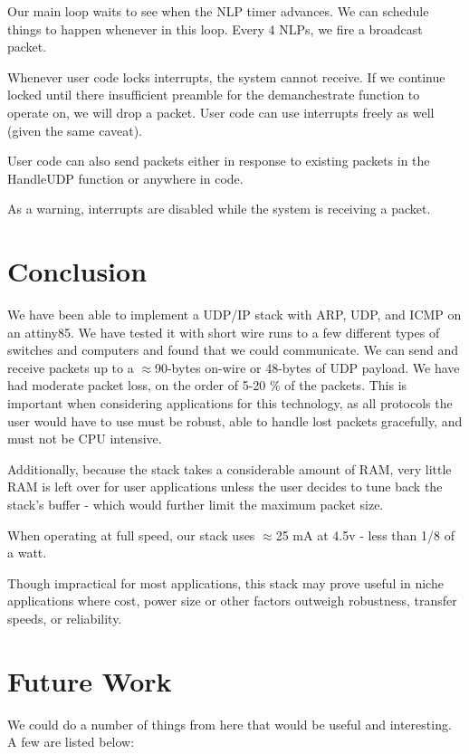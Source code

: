 \documentclass[13pt]{ltxdoc}
\begin{document}
Our main loop waits to see when the NLP timer advances.  We can schedule things to happen whenever in this loop. 
Every 4 NLPs, we fire a broadcast packet.  

Whenever user code locks interrupts, the system cannot receive.  If we continue locked until there insufficient
preamble for the demanchestrate function to operate on, we will drop a packet.  User code can use interrupts freely as well
(given the same caveat).

User code can also send packets either in response to existing packets in the HandleUDP function or anywhere in code.

As a warning, interrupts are disabled while the system is receiving a packet.

\section{Conclusion}
We have been able to implement a UDP/IP stack with ARP, UDP, and ICMP on an attiny85.  We have tested it
with short wire runs to a few different types of switches and computers and found that we could communicate.
We can send and receive packets up to a $\approx$90-bytes on-wire or 48-bytes of UDP payload.
We have had moderate packet loss, on the order of 5-20 \% of the packets.  This is important
when considering applications for this technology, as all protocols the user would have to use must be
robust, able to handle lost packets gracefully, and must not be CPU intensive.

Additionally, because the stack takes a considerable amount of RAM, very little RAM is left over for user
applications unless the user decides to tune back the stack's buffer - which would further limit the 
maximum packet size.

When operating at full speed, our stack uses $\approx$25 mA at 4.5v - less than 1/8 of a watt.

Though impractical for most applications, this stack may prove useful in niche applications where 
cost, power size or other factors outweigh robustness, transfer speeds, or reliability.

\section{Future Work}
We could do a number of things from here that would be useful and interesting.  A few are listed below:
\end{document}
